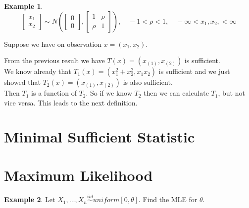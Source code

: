 \documentclass[12pt]{article}
\theoremstyle{definition}
\newtheorem*{example}{Example}
\begin{document}
\begin{example}
\begin{equation*}
\begin{bmatrix}
x_1 \\
x_2
\end{bmatrix} \sim
N \left(
\begin{bmatrix}
0 \\
0
\end{bmatrix}
,
\begin{bmatrix}
1 & \rho \\
\rho & 1
\end{bmatrix}
\right),
\quad
-1 < \rho < 1,
\quad
-\infty < x_1, x_2, < \infty
\end{equation*}

Suppose we have on observation $x = (x_1, x_2)$.

From the previous result we have $T(x) = (x_{(1)}, x_{(2)})$ is
sufficient. \\

We know already that $T_1(x) = (x_1^2 + x_2^2, x_1 x_2)$ is sufficient and
we just showed that $T_2(x) = (x_{(1)}, x_{(2)})$ is also sufficient. \\

Then $T_1$ is a function of $T_2$. So if we know $T_2$ then we can calculate
$T_1$, but not vice versa. This leads to the next definition.
\end{example}

\section{Minimal Sufficient Statistic}





\section{Maximum Likelihood}

\begin{example}
Let $X_1, \ldots, X_n \overset{iid}{\sim} uniform[0,\theta]$. Find the MLE for $\theta$.
\end{example}
\end{document}
